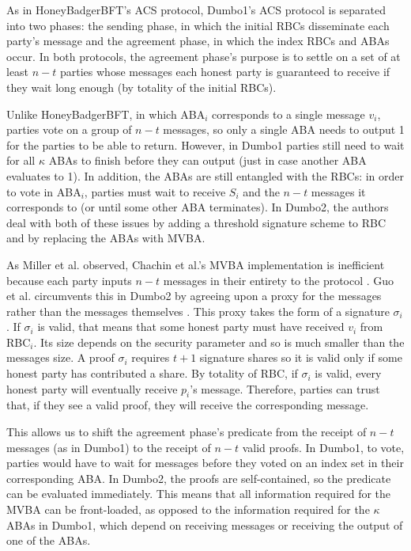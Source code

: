 \documentclass{article}
\begin{document}
As in HoneyBadgerBFT's ACS protocol, Dumbo1's ACS protocol is separated into two phases: the sending phase, in which the initial RBCs disseminate each party's message and the agreement phase, in which the index RBCs and ABAs occur. In both protocols, the agreement phase's purpose is to settle on a set of at least $n - t$ parties whose messages each honest party is guaranteed to receive if they wait long enough (by totality of the initial RBCs).


Unlike HoneyBadgerBFT, in which ABA$_i$ corresponds to a single message $v_i$, parties vote on a group of $n  - t$ messages, so only a single ABA needs to output 1 for the parties to be able to return. However, in Dumbo1 parties still need to wait for all $\kappa$ ABAs to finish before they can output (just in case another ABA evaluates to 1). In addition, the ABAs are still entangled with the RBCs: in order to vote in ABA$_i$, parties must wait to receive $S_i$ and the $n - t$ messages it corresponds to (or until some other ABA terminates). In Dumbo2, the authors deal with both of these issues by adding a threshold signature scheme to RBC and by replacing the ABAs with MVBA.

As Miller et al. observed, Chachin et al.'s MVBA implementation is inefficient because each party inputs $n - t$ messages in their entirety to the protocol \cite{miller2016honey} \cite{cachin2001secure}. Guo et al. circumvents this in Dumbo2 by agreeing upon a proxy for the messages rather than the messages themselves \cite{guo2020dumbo}. This proxy takes the form of a signature $\sigma_i$. If $\sigma_i$ is valid, that means that some honest party must have received $v_i$ from RBC$_i$. Its size depends on the security parameter and so is much smaller than the messages size. A proof $\sigma_i$ requires $t + 1$ signature shares so it is valid only if some honest party has contributed a share. By totality of RBC, if $\sigma_i$ is valid, every honest party will eventually receive $p_i$'s message. Therefore, parties can trust that, if they see a valid proof, they will receive the corresponding message.

This allows us to shift the agreement phase's predicate from the receipt of $n - t$ messages (as in Dumbo1) to the receipt of $n - t$ valid proofs. In Dumbo1, to vote, parties would have to wait for messages before they voted on an index set in their corresponding ABA. In Dumbo2, the proofs are self-contained, so the predicate can be evaluated immediately. This means that all information required for the MVBA can be front-loaded, as opposed to the information required for the $\kappa$ ABAs in Dumbo1, which depend on receiving messages or receiving the output of one of the ABAs. 
\end{document}
